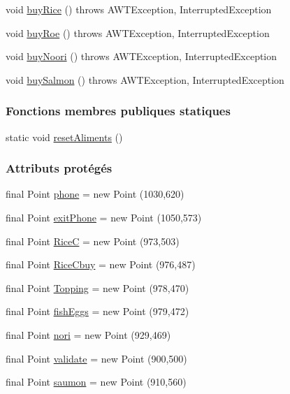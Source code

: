 \begin{DoxyCompactItemize}
\item 
void \hyperlink{classSuchi_1_1Recette_a6e0c330317a6f65f2961d35f262362e7}{buy\+Rice} ()  throws A\+W\+T\+Exception, Interrupted\+Exception
\item 
void \hyperlink{classSuchi_1_1Recette_a019d29ed18bfa21dd4bf2ec681761fbf}{buy\+Roe} ()  throws A\+W\+T\+Exception, Interrupted\+Exception
\item 
void \hyperlink{classSuchi_1_1Recette_a31ee8b7bb1aeb396895509a5d5dea094}{buy\+Noori} ()  throws A\+W\+T\+Exception, Interrupted\+Exception
\item 
void \hyperlink{classSuchi_1_1Recette_aef0e38b7827110dbb4fd6a70777cddc1}{buy\+Salmon} ()  throws A\+W\+T\+Exception, Interrupted\+Exception
\end{DoxyCompactItemize}
\subsubsection*{Fonctions membres publiques statiques}
\begin{DoxyCompactItemize}
\item 
static void \hyperlink{classSuchi_1_1Recette_a99446c824f7bffe26c36e8433a4b18b3}{reset\+Aliments} ()
\end{DoxyCompactItemize}
\subsubsection*{Attributs protégés}
\begin{DoxyCompactItemize}
\item 
final Point \hyperlink{classSuchi_1_1Recette_a89465932bd180079526cfc1f8b8af456}{phone} = new Point (1030,620)
\item 
final Point \hyperlink{classSuchi_1_1Recette_ac7ff51ea8fa06174c38c52121b0ef767}{exit\+Phone} = new Point (1050,573)
\item 
final Point \hyperlink{classSuchi_1_1Recette_a36ec8dc3a30b3f1dba74d3aa354f9f11}{Rice\+C} = new Point (973,503)
\item 
final Point \hyperlink{classSuchi_1_1Recette_afc63b1a3fa7d921d606dc0c99d52cdf4}{Rice\+Cbuy} = new Point (976,487)
\item 
final Point \hyperlink{classSuchi_1_1Recette_a4810b2254c050209fba27757066668b3}{Topping} = new Point (978,470)
\item 
final Point \hyperlink{classSuchi_1_1Recette_a9d19fcc0de54e124694592bc35d97a1d}{fish\+Eggs} = new Point (979,472)
\item 
final Point \hyperlink{classSuchi_1_1Recette_ab86193f9fe4491190e232c4e7f93bed5}{nori} = new Point (929,469)
\item 
final Point \hyperlink{classSuchi_1_1Recette_aff16265c9b0b819091af71f64ef84be7}{validate} = new Point (900,500)
\item 
final Point \hyperlink{classSuchi_1_1Recette_a17aeabd21e3d4d55d7caae9a40bfc6a1}{saumon} = new Point (910,560)
\end{DoxyCompactItemize}
